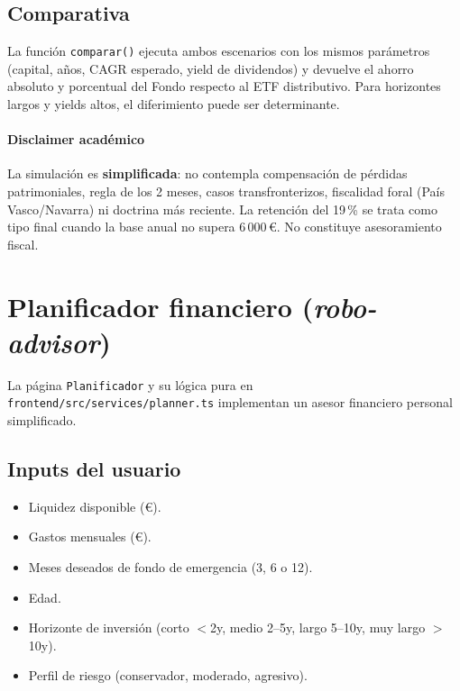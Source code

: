 \documentclass[11pt,a4paper]{article}
\begin{document}
\subsection{Comparativa}

La función \texttt{comparar()} ejecuta ambos escenarios con los mismos parámetros (capital, años, CAGR esperado, yield de dividendos) y devuelve el ahorro absoluto y porcentual del Fondo respecto al ETF distributivo. Para horizontes largos y yields altos, el diferimiento puede ser determinante.

\paragraph{Disclaimer académico}
La simulación es \textbf{simplificada}: no contempla compensación de pérdidas patrimoniales, regla de los 2 meses, casos transfronterizos, fiscalidad foral (País Vasco/Navarra) ni doctrina más reciente. La retención del 19\,\% se trata como tipo final cuando la base anual no supera 6\,000\,€. No constituye asesoramiento fiscal.

\section{Planificador financiero (\textit{robo-advisor})}

La página \texttt{Planificador} y su lógica pura en \texttt{frontend/src/services/planner.ts} implementan un asesor financiero personal simplificado.

\subsection{Inputs del usuario}

\begin{itemize}
  \item Liquidez disponible (€).
  \item Gastos mensuales (€).
  \item Meses deseados de fondo de emergencia (3, 6 o 12).
  \item Edad.
  \item Horizonte de inversión (corto $<$2y, medio 2--5y, largo 5--10y, muy largo $>$10y).
  \item Perfil de riesgo (conservador, moderado, agresivo).
\end{itemize}
\end{document}
